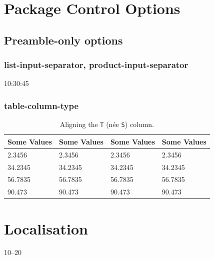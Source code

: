 \documentclass{article}
\providecommand{\toprule}{\hline}
\providecommand{\midrule}{\hline}
\providecommand{\bottomrule}{\hline}
\begin{document}

\setcounter{section}{3}
\section{Package Control Options}

\setcounter{subsection}{13}
\subsection{Preamble-only options}

\subsubsection{list-input-separator, product-input-separator}

\numlist{10:30:45}


\subsubsection{table-column-type}

\begin{table}[h]
\caption{Aligning the \texttt{T} (n\'ee \texttt{S}) column.%
\label{tab:S:align}}
\centering
{}
\begin{tabular}{@{}
T[table-alignment-mode = marker]
T[table-number-alignment = center]
T[table-number-alignment = left]
T[table-number-alignment = right]
@{}}
\toprule
{Some Values} & {Some Values} & {Some Values} & {Some Values} \\
\midrule
2.3456 & 2.3456 & 2.3456 & 2.3456 \\
34.2345 & 34.2345 & 34.2345 & 34.2345 \\
56.7835 & 56.7835 & 56.7835 & 56.7835 \\
90.473 & 90.473 & 90.473 & 90.473 \\
\bottomrule
\end{tabular}
\end{table}

\setcounter{section}{7}

\section{Localisation}

\numrange{10}{20}
\end{document}
